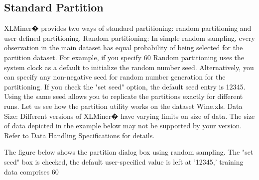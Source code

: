 \subsection{Standard Partition}
XLMiner� provides two ways of standard partitioning: random partitioning and user-defined partitioning.
Random partitioning: In simple random sampling, every observation in the main dataset has equal probability of being selected for the partition dataset. For example, if you specify 60%
Random partitioning uses the system clock as a default to initialize the random number seed. Alternatively, you can specify any non-negative seed for random number generation for the partitioning. If you check the "set seed" option, the default seed entry is 12345. 
Using the same seed allows you to replicate the partitions exactly for different runs. 
Let us see how the partition utility works on the dataset Wine.xls.
Data Size: Different versions of XLMiner�  have varying limits on size of data. The size of data depicted in the example below may not be supported by your version. Refer to Data Handling Specifications for details.

The figure below shows the partition dialog box using random sampling. The "set seed" box is checked, the default user-specified value is left at '12345,' training data comprises 60%

